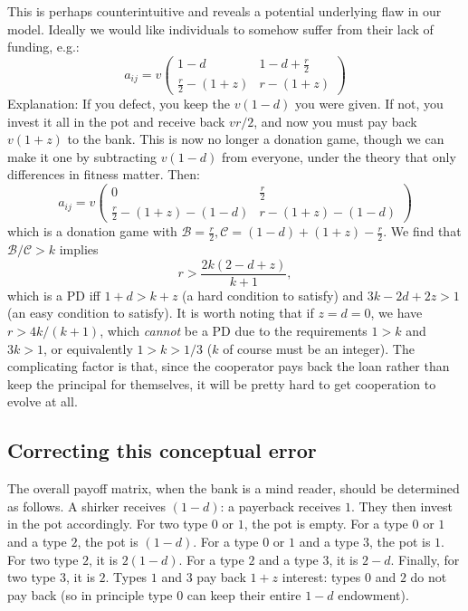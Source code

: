 \documentclass[13pt]{amsart}
\newcommand{\B}{\mathcal{B}}
\newcommand{\C}{\mathcal{C}}
\begin{document}
This is perhaps counterintuitive and reveals a potential underlying flaw in our model.
Ideally we would like individuals to somehow suffer from their lack of funding, e.g.:
\begin{equation}
    a_{ij} = v
    \begin{pmatrix}
        1-d & 1-d + \frac{r}{2} \\
        \frac{r}{2} - (1+z) & r - (1+z)
    \end{pmatrix}
\end{equation}
Explanation:
If you defect, you keep the $v(1-d)$ you were given.
If not, you invest it all in the pot and receive back $vr/2$, and now you must pay back $v(1+z)$ to the bank.
This is now no longer a donation game, though we can make it one by subtracting $v(1-d)$ from everyone, under the theory that only differences in fitness matter.
Then:
\begin{equation}
    a_{ij} = v
    \begin{pmatrix}
        0 & \frac{r}{2} \\
        \frac{r}{2} - (1+z) - (1-d) & r - (1+z) - (1-d)
    \end{pmatrix}
\end{equation}
which is a donation game with $\B = \frac{r}{2}, \C = (1-d) + (1+z) - \frac{r}{2}$.
We find that $\B/\C > k$ implies
\begin{equation}
    r > \frac{2k(2 - d + z)}{k+1},
    \label{eq:0v3}
\end{equation}
which is a PD iff $1+d > k+z$ (a hard condition to satisfy) and $3k - 2d + 2z > 1$ (an easy condition to satisfy).
It is worth noting that if $z = d = 0$, we have $r > 4k/(k+1)$, which \emph{cannot} be a PD due to the requirements $1 > k$ and $3k > 1$, or equivalently $1 > k > 1/3$ ($k$ of course must be an integer).
The complicating factor is that, since the cooperator pays back the loan rather than keep the principal for themselves, it will be pretty hard to get cooperation to evolve at all.

\subsection*{Correcting this conceptual error}

The overall payoff matrix, when the bank is a mind reader, should be determined as follows.
A shirker receives $(1-d)$: a payerback receives $1$.
They then invest in the pot accordingly.
For two type $0$ or $1$, the pot is empty.
For a type $0$ or $1$ and a type $2$, the pot is $(1-d)$.
For a type $0$ or $1$ and a type $3$, the pot is $1$.
For two type $2$, it is $2(1-d)$.
For a type $2$ and a type $3$, it is $2-d$.
Finally, for two type $3$, it is $2$.
Types $1$ and $3$ pay back $1 + z$ interest: types $0$ and $2$ do not pay back (so in principle type $0$ can keep their entire $1-d$ endowment).
\end{document}
